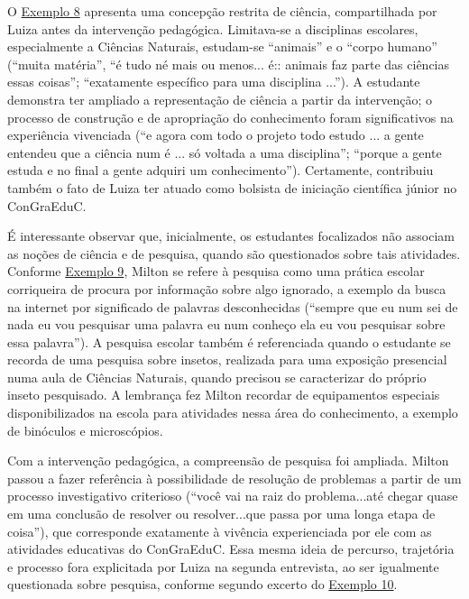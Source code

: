 O \hyperref[tab-09]{Exemplo 8} apresenta uma concepção restrita de ciência, compartilhada
por Luiza antes da intervenção pedagógica. Limitava-se a disciplinas
escolares, especialmente a Ciências Naturais, estudam-se ``animais'' e o
``corpo humano'' (``muita matéria'', ``é tudo né mais ou menos... é::
animais faz parte das ciências essas coisas''; ``exatamente específico
para uma disciplina ...''). A estudante demonstra ter ampliado a
representação de ciência a partir da intervenção; o processo de
construção e de apropriação do conhecimento foram significativos na
experiência vivenciada (``e agora com todo o projeto todo estudo ... a
gente entendeu que a ciência num é ... só voltada a uma disciplina'';
``porque a gente estuda e no final a gente adquiri um conhecimento'').
Certamente, contribuiu também o fato de Luiza ter atuado como bolsista
de iniciação científica júnior no ConGraEduC.


\label{anchor-13}{}

É interessante observar que, inicialmente, os estudantes focalizados não
associam as noções de ciência e de pesquisa, quando são questionados
sobre tais atividades. Conforme \hyperref[tab-10]{Exemplo 9}, Milton se refere à pesquisa
como uma prática escolar corriqueira de procura por informação sobre
algo ignorado, a exemplo da busca na internet por significado de
palavras desconhecidas (``sempre que eu num sei de nada eu vou pesquisar
uma palavra eu num conheço ela eu vou pesquisar sobre essa palavra''). A
pesquisa escolar também é referenciada quando o estudante se recorda de
uma pesquisa sobre insetos, realizada para uma exposição presencial numa
aula de Ciências Naturais, quando precisou se caracterizar do próprio
inseto pesquisado. A lembrança fez Milton recordar de equipamentos
especiais disponibilizados na escola para atividades nessa área do
conhecimento, a exemplo de binóculos e microscópios.




Com a intervenção pedagógica, a compreensão de pesquisa foi ampliada.
Milton passou a fazer referência à possibilidade de resolução de
problemas a partir de um processo investigativo criterioso (``você vai
na raiz do problema...até chegar quase em uma conclusão de resolver ou
resolver...que passa por uma longa etapa de coisa''), que corresponde
exatamente à vivência experienciada por ele com as atividades educativas
do ConGraEduC. Essa mesma ideia de percurso, trajetória e processo fora
explicitada por Luiza na segunda entrevista, ao ser igualmente
questionada sobre pesquisa, conforme segundo excerto do \hyperref[tab-11]{Exemplo 10}.

